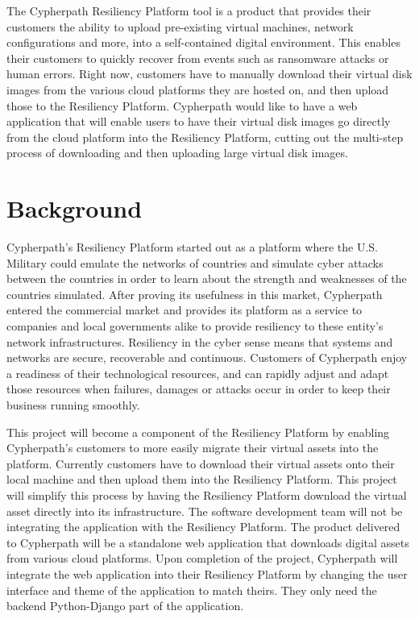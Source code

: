 \documentclass{article}
\begin{document}
	The Cypherpath Resiliency Platform tool is a product that provides their customers the ability to upload pre-existing virtual machines, network configurations and more, into 
    a self-contained digital environment. This enables their customers to quickly recover from events such as ransomware attacks or human errors. Right now, customers have to manually download their virtual disk images from
    the various cloud platforms they are hosted on, and then upload those to the Resiliency Platform. Cypherpath would like to have a web application that will enable users to have their virtual disk images go
    directly from the cloud platform into the Resiliency Platform, cutting out the multi-step process of downloading and then uploading large virtual disk images.
	
    \section{Background}
    Cypherpath's Resiliency Platform started out as a platform where the U.S. Military could emulate the networks of countries and simulate cyber attacks between the countries in order to
    learn about the strength and weaknesses of the countries simulated. After proving its usefulness in this market, Cypherpath entered the commercial market and provides its platform as a service to
    companies and local governments alike to provide resiliency to these entity's network infrastructures. Resiliency in the cyber sense means that systems and networks are secure, recoverable and
    continuous. Customers of Cypherpath enjoy a readiness of their technological resources, and can rapidly adjust and adapt those resources when failures, damages or attacks occur in order to keep their business running smoothly.

    This project will become a component of the Resiliency Platform by enabling Cypherpath's customers to more easily migrate their virtual assets into the platform. Currently customers have to download
    their virtual assets onto their local machine and then upload them into the Resiliency Platform. This project will simplify this process by having the Resiliency Platform download the virtual asset directly
    into its infrastructure. The software development team will not be integrating the application with the Resiliency Platform. The product delivered to Cypherpath will be a standalone web application that downloads
    digital assets from various cloud platforms. Upon completion of the project, Cypherpath will integrate the web application into their Resiliency Platform by changing the user interface and theme of the application to match
    theirs. They only need the backend Python-Django part of the application.
\end{document}
